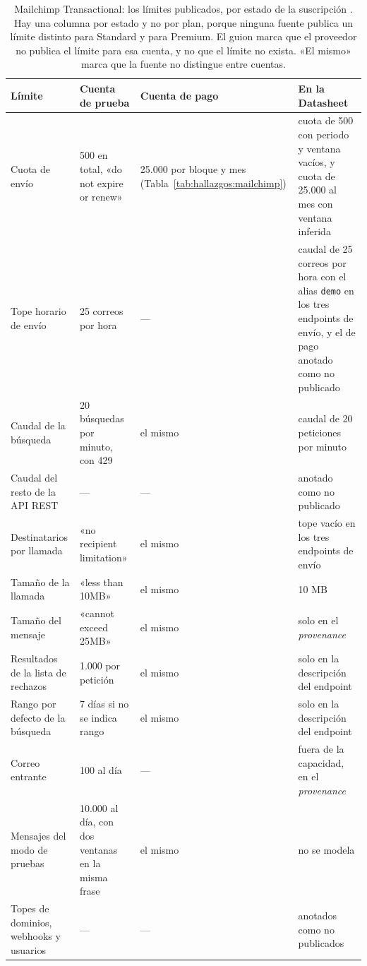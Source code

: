 \begin{table}[H]
\centering
\scriptsize
\setlength{\tabcolsep}{3pt}
\renewcommand{\arraystretch}{1.15}
\begin{tabular}{|p{}|p{}|p{}|p{}|}
\hline
\raggedright \textbf{Límite} & \raggedright \textbf{Cuenta de prueba} & \raggedright \textbf{Cuenta de pago} & \raggedright \textbf{En la Datasheet} \tabularnewline
\hline
\raggedright Cuota de envío & \raggedright 500 en total, «do not expire or renew» & \raggedright 25.000 por bloque y mes (Tabla~\ref{tab:hallazgos:mailchimp}) & \raggedright cuota de 500 con periodo y ventana vacíos, y cuota de 25.000 al mes con ventana inferida \tabularnewline
\hline
\raggedright Tope horario de envío & \raggedright 25 correos por hora & \raggedright --- & \raggedright caudal de 25 correos por hora con el alias \texttt{demo} en los tres endpoints de envío, y el de pago anotado como no publicado \tabularnewline
\hline
\raggedright Caudal de la búsqueda & \raggedright 20 búsquedas por minuto, con 429 & \raggedright el mismo & \raggedright caudal de 20 peticiones por minuto \tabularnewline
\hline
\raggedright Caudal del resto de la API REST & \raggedright --- & \raggedright --- & \raggedright anotado como no publicado \tabularnewline
\hline
\raggedright Destinatarios por llamada & \raggedright «no recipient limitation» & \raggedright el mismo & \raggedright tope vacío en los tres endpoints de envío \tabularnewline
\hline
\raggedright Tamaño de la llamada & \raggedright «less than 10MB» & \raggedright el mismo & \raggedright 10 MB \tabularnewline
\hline
\raggedright Tamaño del mensaje & \raggedright «cannot exceed 25MB» & \raggedright el mismo & \raggedright solo en el \textit{provenance} \tabularnewline
\hline
\raggedright Resultados de la lista de rechazos & \raggedright 1.000 por petición & \raggedright el mismo & \raggedright solo en la descripción del endpoint \tabularnewline
\hline
\raggedright Rango por defecto de la búsqueda & \raggedright 7 días si no se indica rango & \raggedright el mismo & \raggedright solo en la descripción del endpoint \tabularnewline
\hline
\raggedright Correo entrante & \raggedright 100 al día & \raggedright --- & \raggedright fuera de la capacidad, en el \textit{provenance} \tabularnewline
\hline
\raggedright Mensajes del modo de pruebas & \raggedright 10.000 al día, con dos ventanas en la misma frase & \raggedright el mismo & \raggedright no se modela \tabularnewline
\hline
\raggedright Topes de dominios, webhooks y usuarios & \raggedright --- & \raggedright --- & \raggedright anotados como no publicados \tabularnewline
\hline
\end{tabular}
\caption{Mailchimp Transactional: los límites publicados, por estado de la suscripción
\citep{mailchimpdocs}. Hay una columna por estado y no por plan, porque ninguna fuente
publica un límite distinto para Standard y para Premium. El guion marca que el proveedor
no publica el límite para esa cuenta, y no que el límite no exista. «El mismo» marca que
la fuente no distingue entre cuentas.}
\label{tab:hallazgos:mailchimp:limites}
\end{table}

